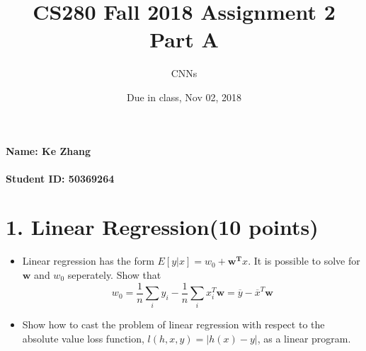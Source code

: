\documentclass[12pt]{article}%
\begin{document}
\title{CS280 Fall 2018 Assignment 2 \\ Part A}
\author{CNNs}
\date{Due in class, Nov 02, 2018}
\maketitle

\paragraph{Name: Ke Zhang}

\paragraph{Student ID: 50369264}

\newpage

\section*{1. Linear Regression(10 points)}
\begin{itemize}
	\item Linear regression has the form $E[y\lvert x] = w_{0} + \bm{w^{T}}x$. It is possible to solve for $\bm{w}$ and $w_{0}$ seperately. Show that
	\begin{equation*}
	w_{0} = \frac{1}{n}\sum_{i}y_{i} - \frac{1}{n}\sum_{i}x_{i}^{T}\bm{w} = \overline{y} - \overline{x}^{T}\bm{w} 
	\end{equation*}
	
	\item Show how to cast the problem of linear regression with respect to the absolute value loss function, $l(h,x,y)=\lvert h(x) - y \rvert$, as a linear program.
\end{itemize}
\end{document}

